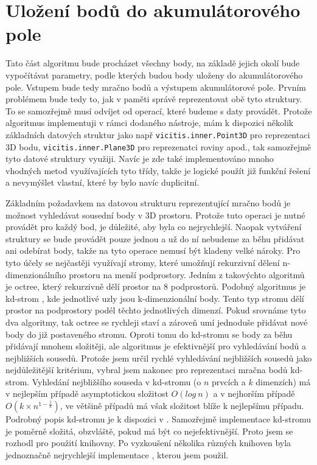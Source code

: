 \documentclass[11pt,twoside,a4paper]{book}
\begin{document}
\section{Uložení bodů do akumulátorového pole}

Tato část algoritmu bude procházet všechny body, na základě jejich okolí bude vypočítávat parametry, podle kterých budou body uloženy do akumulátorového pole. Vstupem bude tedy mračno bodů a výstupem akumulátorové pole. Prvním problémem bude tedy to, jak v paměti správě reprezentovat obě tyto struktury. To se samozřejmě musí odvíjet od operací, které budeme s daty provádět. Protože algoritmus implementuji v rámci dodaného nástroje, mám k dispozici několik základních datových struktur jako např \verb|vicitis.inner.Point3D| pro reprezentaci 3D bodu, \verb|vicitis.inner.Plane3D| pro reprezenatci roviny apod., tak samozřejmě tyto datové struktury využiji. Navíc je zde také implementováno mnoho vhodných metod využívajících tyto třídy, takže je logické použít již funkční řešení a nevymýšlet vlastní, které by bylo navíc duplicitní.

Základním požadavkem na datovou strukturu reprezentující mračno bodů je možnost vyhledávat sousední body v 3D prostoru. Protože tuto operaci je nutné provádět pro každý bod, je důležité, aby byla co nejrychlejší. Naopak vytváření struktury se bude provádět pouze jednou a už do ní nebudeme za běhu přidávat ani odebírat body, takže na tyto operace nemusí být kladeny velké nároky. Pro tyto účely se nejčastěji využívají stromy, které umožňují rekurzivní dělení n-dimenzionálního prostoru na menší podprostory. Jedním z takovýchto algoritmů je octree, který rekurzivně dělí prostor na 8 podprostorů. Podobný algoritmus je kd-strom \cite{wiki:kdtree}, kde jednotlivé uzly jsou k-dimenzionální body. Tento typ stromu dělí prostor na podprostory podél těchto jednotlivých dimenzí. Pokud srovnáme tyto dva algoritmy, tak octree se rychleji staví a zároveň umí jednoduše přidávat nové body do již postaveného stromu. Oproti tomu do kd-stromu se body za běhu přidávají mnohem složitěji, ale algoritmus je efektivnější pro vyhledávání bodů a nejbližších sousedů. Protože jsem určil rychlé vyhledávání nejbližších sousedů jako nejdůležitější kritérium, vybral jsem nakonec pro reprezentaci mračna bodů kd-strom. Vyhledání nejbližšího souseda v kd-stromu (o $n$ prvcích a $k$ dimenzích) má v nejlepším případě asymptotickou složitost $O(log~n)$ a v nejhorším případě $O(k \times n^{1-\frac{1}{k}})$, ve většině případů má však složitost blíže k nejlepšímu případu. Podrobný popis kd-stromu je k dispozici v \cite{wiki:kdtree}. Samozřejmě implementace kd-stromu je poměrně složitá, obzvláště, pokud má být co nejefektivnější. Proto jsem se rozhodl pro použití knihovny. Po vyzkoušení několika různých knihoven byla jednoznačně nejrychlejší implementace \cite{kdtree}, kterou jsem použil.
\end{document}
